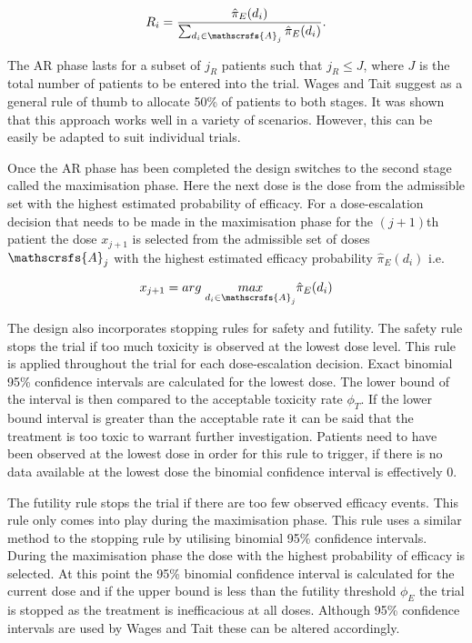 \begin{equation}
R_i = \frac{\hat{\pi}_E(d_i)}{\sum_{d_i \in \mathscrsfs{A}_j}\hat{\pi}_E(d_i)}. 
\end{equation}

The AR phase lasts for a subset of $j_R$ patients such that $j_R \leq J$, where $J$ is the total number of patients to be entered into the trial. Wages and Tait suggest as a general rule of thumb to allocate 50\% of patients to both stages. It was shown that this approach works well in a variety of scenarios. However, this can be easily be adapted to suit individual trials. 

Once the AR phase has been completed the design switches to the second stage called the maximisation phase. Here the next dose is the dose from the admissible set with the highest estimated probability of efficacy. For a dose-escalation decision that needs to be made in the maximisation phase for the $(j+1)$th patient the dose $x_{j+1}$ is selected from the admissible set of doses $\mathscrsfs{A}_j$ with the highest estimated efficacy probability $\hat{\pi}_E(d_i)$ i.e. 

\begin{equation}
x_{j+1} = arg \; \underset{d_i \in \mathscrsfs{A}_j}{max}\hat{\pi}_E(d_i)
\end{equation}

The design also incorporates stopping rules for safety and futility. The safety rule stops the trial if too much toxicity is observed at the lowest dose level. This rule is applied throughout the trial for each dose-escalation decision. Exact binomial 95\% confidence intervals are calculated for the lowest dose. The lower bound of the interval is then compared to the acceptable toxicity rate $\phi_T$. If the lower bound interval is greater than the acceptable rate it can be said that the treatment is too toxic to warrant further investigation. Patients need to have been observed at the lowest dose in order for this rule to trigger, if there is no data available at the lowest dose the binomial confidence interval is effectively 0. 

The futility rule stops the trial if there are too few observed efficacy events. This rule only comes into play during the maximisation phase. This rule uses a similar method to the stopping rule by utilising binomial 95\% confidence intervals. During the maximisation phase the dose with the highest probability of efficacy is selected. At this point the 95\% binomial confidence interval is calculated for the current dose and if the upper bound is less than the futility threshold $\phi_E$ the trial is stopped as the treatment is inefficacious at all doses. Although 95\% confidence intervals are used by Wages and Tait these can be altered accordingly. 


